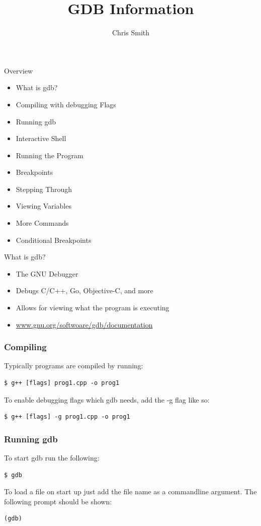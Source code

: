 \documentclass[11pt]{beamer}
\author{Chris Smith}
\title{GDB Information}
\institute{SDSMT ACM/LUG}
\begin{document}
\begin{frame}
\titlepage
\end{frame}

\begin{frame}{Overview}
\begin{itemize}
\item What is gdb?
\item Compiling with debugging Flags
\item Running gdb
\item Interactive Shell
\item Running the Program
\item Breakpoints
\item Stepping Through
\item Viewing Variables
\item More Commands
\item Conditional Breakpoints
\end{itemize}
\end{frame}


\begin{frame}{What is gdb?}
\begin{itemize}
\item The GNU Debugger
\item Debugs C/C++, Go, Objective-C, and more
\item Allows for viewing what the program is executing
\item \href{https://www.gnu.org/software/gdb/documentation/}{www.gnu.org/softwoare/gdb/documentation}
\end{itemize}
\end{frame}

\begin{frame}[fragile]
\frametitle{Compiling}
Typically programs are compiled by running:
\begin{lstlisting}[style=BashInputStyle]
 $ g++ [flags] prog1.cpp -o prog1
\end{lstlisting}
To enable debugging flags which gdb needs, add the -g flag like so:
\begin{lstlisting}[style=BashInputStyle]
 $ g++ [flags] -g prog1.cpp -o prog1
\end{lstlisting}
\end{frame}

\begin{frame}[fragile]
\frametitle{Running gdb}
To start gdb run the following:
\begin{lstlisting}[style=BashInputStyle]
 $ gdb
\end{lstlisting}
 To load a file on start up just add the file name as a commandline argument. 
 \break
 \break
 The following prompt should be shown:
\begin{lstlisting}[style=BashInputStyle]
 (gdb)
\end{lstlisting}
\end{frame}
\end{document}
